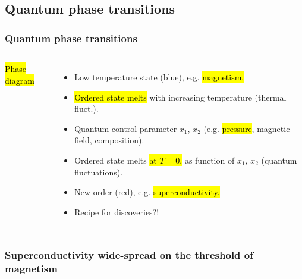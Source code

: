\subsection{Quantum phase transitions}
\begin{frame}[label=QuanPhase]
\frametitle{Quantum phase transitions}
\begin{columns}[t]

\hl{Phase diagram}
\centerline{}

\begin{itemize}
\item<1->
Low temperature state (blue), e.g. \hl{magnetism.} 
\item<1->
\hl{Ordered state melts} with increasing temperature (thermal fluct.).
\item<1->
Quantum control parameter $x_1$, $x_2$
(e.g. \hl{pressure}, magnetic field, composition).
\item<1->
Ordered state melts \hl{at $T=0$,} as function of $x_1$, $x_2$ (quantum fluctuations).

\item<2->
New order (red), e.g. \hl{superconductivity.}
\item<2->
Recipe for discoveries?!

\end{itemize}
\end{columns}
\end{frame}


\begin{frame}[label=ThreshMagn]
\frametitle{Superconductivity wide-spread on the threshold of magnetism}
\begin{columns}[t]
\vspace{-4ex}
\centerline{~}


\centerline{~}

\vspace{2ex}


\end{columns}
\end{frame}





